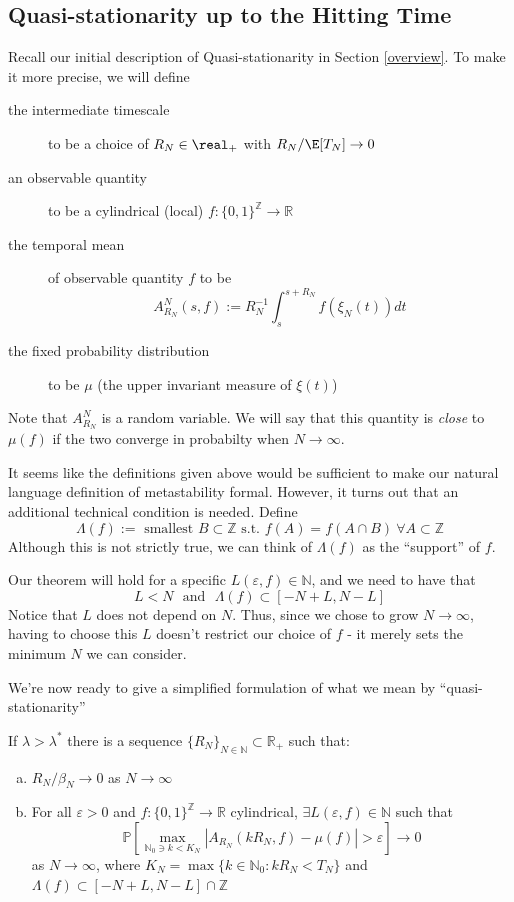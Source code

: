 \documentclass{scrartcl}
\begin{document}
\subsection{Quasi-stationarity up to the Hitting Time}

Recall our initial description of Quasi-stationarity in Section \ref{overview}. To make it more precise, we will define
\begin{description}
    \item[the intermediate timescale] to be a choice of $R_{N} \in \real_{+}$ with $R_{N}/\E[T_{N}] \to 0$
    \item[an observable quantity] to be a cylindrical (local) $f:\{0,1\}^\mathbb{Z} \rightarrow \mathbb{R}$
    \item[the temporal mean] of observable quantity $f$ to be
    \[
        A^N_{R_N}(s, f) := R_N^{-1}\int_s^{s+R_N}f(\xi_N(t))dt
    \]
    \item[the fixed probability distribution] to be $\mu$ (the upper invariant measure of $\xi(t)$)
\end{description}
Note that $A^N_{R_N}$ is a random variable. We will say that this quantity is \emph{close} to $\mu(f)$ if the two converge in probabilty when $N \rightarrow \infty$.

It seems like the definitions given above would be sufficient to make our natural language definition of metastability formal. However, it turns out that an additional technical 
condition is needed. Define
    \[
        \Lambda(f) :=  \text{ smallest } B\subset \mathbb{Z} \text{ s.t. } f(A) = f(A\cap B) \ \forall A \subset \mathbb{Z}
    \]
    Although this is not strictly true, we can think of $\Lambda(f)$ as the ``support'' of $f$.

Our theorem will hold for a specific $L(\varepsilon, f) \in \mathbb{N}$, and we need to have that
\[
    L < N \text{~~and~~} \Lambda(f) \subset [-N+L, N-L]
\]
Notice that $L$ does not depend on $N$. Thus, since we chose to grow $N \rightarrow \infty$, having to choose this $L$ doesn't restrict our choice of $f$ - it merely sets the minimum
 $N$ we can consider.

 We're now ready to give a simplified formulation of what we mean by ``quasi-stationarity''
 \begin{theorem} 
        If $\lambda > \lambda^*$ there is a sequence $\{R_N\}_{N \in \mathbb{N}} \subset \mathbb{R_+}$ such that:
        \begin{enumerate}[(a)]
            \item $R_N/\beta_N \rightarrow 0$ as $N\rightarrow \infty$
            \item For all $\varepsilon > 0$ and $f:\{0,1\}^\mathbb{Z} \rightarrow \mathbb{R}$ cylindrical,  $\exists L(\varepsilon, f) \in \mathbb{N}$ such that
                  \[
                      \mathbb{P}\left[ \max_{\mathbb{N}_0 \ni k < K_N}|A_{R_N}(kR_N, f) - \mu(f)| > \varepsilon\right] \rightarrow 0
                  \]
                  as $N \rightarrow \infty$, where $K_N = \max\{k \in \mathbb{N}_0: kR_N < T_N\}$ and $\Lambda(f) \subset [-N + L, N - L] \cap \mathbb{Z}$
        \end{enumerate}
    \end{theorem}
\end{document}
